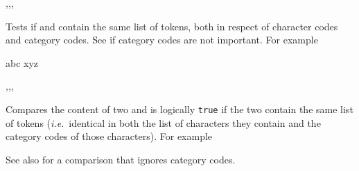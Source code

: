 \documentclass[oneside]{book}
\begin{document}
\begin{function}{\TlIfEq,\TlIfEqT,\TlIfEqF,\TlIfEqTF}
\begin{syntax}
  
   
   
    
\end{syntax}
Tests if  and  contain the
same list of tokens, both in respect of character codes and category
codes. See  if category codes are not important.
For example
\begin{demohigh}
 {abc} {} {}
 {xyz} {} {}
\end{demohigh}
\end{function}

\begin{function}{\TlVarIfEq,\TlVarIfEqT,\TlVarIfEqF,\TlVarIfEqTF}
\begin{syntax}
  
   
   
    
\end{syntax}
Compares the content of two  and
is logically \texttt{true} if the two contain the same list of
tokens (\emph{i.e.}~identical in both the list of characters they
contain and the category codes of those characters). For example
\begin{demohigh}
\TlSet {}
\TlSet {}
\TlSet {}
\TlVarIfEqTF \lTmpaTl {} {}
\TlVarIfEqTF \lTmpaTl {} {}
\end{demohigh}
See also  for a comparison that ignores category codes.
\end{function}
\end{document}
